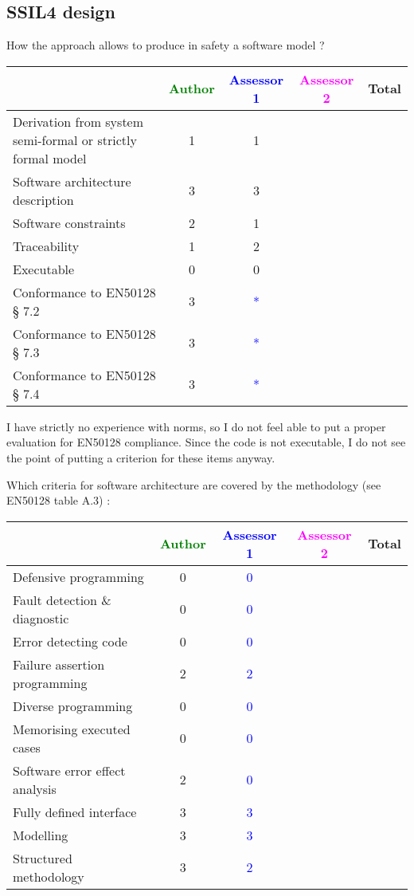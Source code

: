 \subsection{SSIL4 design}

How the approach allows to produce in safety a software model ?

\begin{tabular}{|l | c | c | c | c|}
\hline
& \textcolor{green}{Author} & \textcolor{blue}{Assessor 1} & \textcolor{magenta}{Assessor 2} & Total \\
\hline
Derivation from system semi-formal or strictly formal model & 1 & 1 & & \\
\hline
Software architecture description & 3 & 3 & & \\
\hline
Software constraints & 2 & 1 & & \\
\hline
Traceability & 1 & 2 & & \\
\hline
Executable & 0 & 0 & & \\
\hline
Conformance to EN50128 § 7.2 & 3 & \textcolor{blue}{*} & & \\
\hline
Conformance to EN50128 § 7.3 & 3 & \textcolor{blue}{*} & & \\
\hline
Conformance to EN50128 § 7.4 & 3 & \textcolor{blue}{*} & & \\
\hline
\end{tabular}

\begin{assessor1}
I have strictly no experience with norms, so I do not feel able to put a proper evaluation for EN50128 compliance. Since the code is not executable, I do not see the point of putting a criterion for these items anyway. 
\end{assessor1}

Which criteria for software architecture are covered by the methodology
(see EN50128 table A.3) :

\begin{tabular}{|l | c | c | c | c|}
\hline
& \textcolor{green}{Author} & \textcolor{blue}{Assessor 1} & \textcolor{magenta}{Assessor 2} & Total \\
\hline
Defensive programming & 0 & \textcolor{blue}{0} & & \\
\hline
Fault detection \& diagnostic & 0 & \textcolor{blue}{0} & & \\
\hline
Error detecting code & 0 & \textcolor{blue}{0} & & \\
\hline
Failure assertion programming & 2 & \textcolor{blue}{2} & & \\
\hline
Diverse programming & 0 & \textcolor{blue}{0} & & \\
\hline
Memorising executed cases & 0 & \textcolor{blue}{0} & & \\
\hline
Software error effect analysis & 2 & \textcolor{blue}{0} & & \\
\hline
Fully defined interface & 3 & \textcolor{blue}{3} & & \\
\hline
Modelling & 3 & \textcolor{blue}{3} & & \\
\hline
Structured methodology & 3 & \textcolor{blue}{2} & & \\
\hline
\end{tabular}

